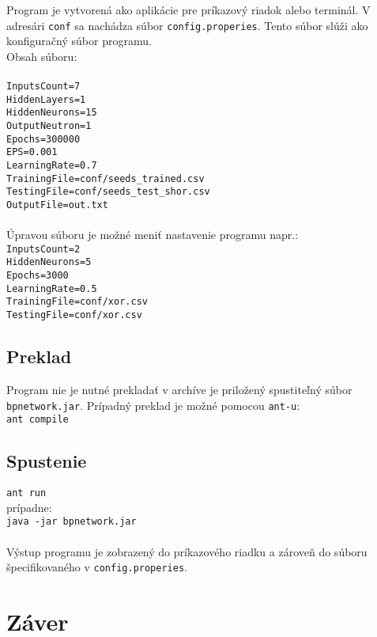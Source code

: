 \documentclass[a4paper, 11pt]{article}
\begin{document}
Program je vytvorená ako aplikácie pre príkazový riadok alebo terminál. V adresári \texttt{conf} sa nachádza súbor \texttt{config.properies}. Tento súbor slúži ako konfiguračný súbor programu.\\ Obsah súboru: \\
\\
\texttt{InputsCount=7\\
HiddenLayers=1\\
HiddenNeurons=15\\
OutputNeutron=1\\
Epochs=300000\\
EPS=0.001\\
LearningRate=0.7\\
TrainingFile=conf/seeds\_trained.csv \\
TestingFile=conf/seeds\_test\_shor.csv \\
OutputFile=out.txt}\\
\\
Úpravou súboru je možné meniť nastavenie programu napr.: \\
\texttt{InputsCount=2\\
HiddenNeurons=5\\
Epochs=3000\\
LearningRate=0.5\\
TrainingFile=conf/xor.csv \\
TestingFile=conf/xor.csv}\\

\subsection*{Preklad}
Program nie je nutné prekladať v archíve je priložený spustiteľný súbor \texttt{bpnetwork.jar}. Prípadný preklad je možné pomocou \texttt{ant-u}:\\
\texttt{ant compile}


\subsection*{Spustenie}
\texttt{ant run}\\
prípadne:\\
\texttt{java -jar bpnetwork.jar}\\
\\
Výstup programu je zobrazený do príkazového riadku a zároveň do súboru špecifikovaného v \texttt{config.properies}.


\section{Záver}
 




	
\end{document}
